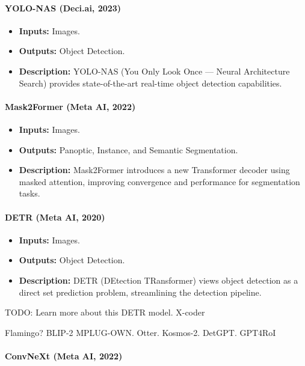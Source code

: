 \documentclass[12pt]{article}
\begin{document}
\paragraph{YOLO-NAS (Deci.ai, 2023)}

\begin{itemize}
    \item \textbf{Inputs:} Images.
    \item \textbf{Outputs:} Object Detection.
    \item \textbf{Description:} YOLO-NAS (You Only Look Once — Neural Architecture Search) provides state-of-the-art real-time object detection capabilities.
\end{itemize}

\paragraph{Mask2Former (Meta AI, 2022)}

\begin{itemize}
    \item \textbf{Inputs:} Images.
    \item \textbf{Outputs:} Panoptic, Instance, and Semantic Segmentation.
    \item \textbf{Description:} Mask2Former introduces a new Transformer decoder using masked attention, improving convergence and performance for segmentation tasks.
\end{itemize}

\paragraph{DETR (Meta AI, 2020)}

\begin{itemize}
    \item \textbf{Inputs:} Images.
    \item \textbf{Outputs:} Object Detection.
    \item \textbf{Description:} DETR (DEtection TRansformer) views object detection as a direct set prediction problem, streamlining the detection pipeline.
\end{itemize}

TODO: Learn more about this DETR model. X-coder

Flamingo? BLIP-2 MPLUG-OWN. Otter. Kosmos-2. DetGPT. GPT4RoI

\paragraph{ConvNeXt (Meta AI, 2022)}
\end{document}
